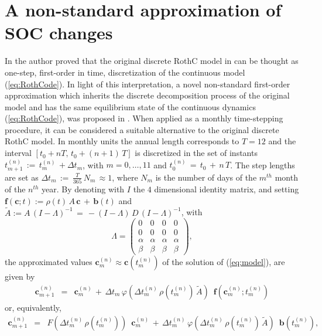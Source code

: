 \section{A non-standard approximation of SOC changes}\label{sec:6}
In \cite{parshotam1996rothamsted} the author proved that the original discrete RothC model  in \cite{coleman1996rothc} can be thought as one-step, first-order in time,  discretization   of the continuous model (\ref{eq:RothCode}). In light of this interpretation, a novel non-standard first-order approximation which inherits  the discrete decomposition process of the original model and has the same equilibrium state of the continuous dynamics  (\ref{eq:RothCode}), was proposed in  \cite{diele2021non}. 
When applied as a  monthly time-stepping procedure,  it can be considered a suitable alternative to the original discrete RothC model. 
In  monthly units the annual length corresponds to  $T=12$ and the interval $[t_0+nT, \, t_0+(n+1)\, T]$ is  discretized  in the set of instants   $t_{m+1}^{(n)}\,:=\, t_{m}^{(n)}\,+ \Delta t_m$, with $m = 0,\dots, 11$ and $t_{0}^{(n)}\,=\,t_0\,+\, n\, T $. The step lengths are set as  $\Delta t_m\,:=\,\displaystyle \frac{T}{365} \, N_m\, \approx 1$, where $N_m$ is the number of days of the $m^{th}$ month of the $n^{th}$ year.  By denoting with $I$ the $4$ dimensional identity matrix, and setting $\mathbf{f}(\mathbf{c}; t):=  \rho(t)\,  A \, \mathbf{c}\,+\,   \mathbf{b}(t) $ 
and  $\widetilde A:= A\,(I-\Lambda)^{-1}\, =\,-(I-\Lambda)\, D\, (I-\Lambda)^{-1}$, with 
$$
 \Lambda=\left(\begin{array}{cccc}
 0 &0 & 0&0 \\
 0 &0 & 0&0 \\
 \alpha & \alpha & \alpha & \alpha\\
 \beta & \beta & \beta & \beta
 \end{array}\right), 
$$
the approximated values $\mathbf{c}_m^{(n)} \approx \mathbf{c}(t_{m}^{(n)}) $ of the solution of (\ref{eq:model}), are given by 
\begin{equation}\label{eq:first}
 \begin{array}{lll}
 \mathbf{c}^{(n)}_{m+1}& =& \mathbf{c}^{(n)}_m \,+\, \Delta t_m \,\varphi(\Delta t^{(n)}_m \,\rho({t_{m}^{(n)}})\, \widetilde A) \,\,\, \mathbf{f}(\mathbf{c}^{(n)}_m; t^{(n)}_m)  \end{array}
\end{equation}
 or, equivalently, 
\begin{equation}\label{eq:second}
 \begin{array}{lll}
 \mathbf{c}^{(n)}_{m+1} &=& F(\Delta t^{(n)}_m\,\rho(t^{(n)}_{m}))\,\,\, \mathbf{c}^{(n)}_m \,+\, \Delta t^{(n)}_m \,\varphi(\Delta t^{(n)}_m\,\rho(t^{(n)}_{m})\, \widetilde A ) \,\,\, \mathbf{b}(t^{(n)}_{m}),
 \end{array}
\end{equation}
